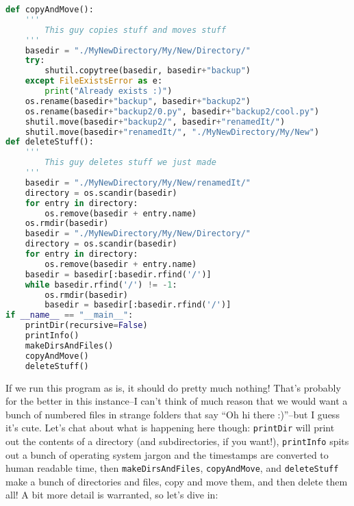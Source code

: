 \documentclass[12pt, twoside, reqno]{book}
\begin{document}
\begin{lstlisting}[language=Python]
def copyAndMove():
    '''
        This guy copies stuff and moves stuff
    '''
    basedir = "./MyNewDirectory/My/New/Directory/"
    try:
        shutil.copytree(basedir, basedir+"backup")
    except FileExistsError as e:
        print("Already exists :)")
    os.rename(basedir+"backup", basedir+"backup2")
    os.rename(basedir+"backup2/0.py", basedir+"backup2/cool.py")
    shutil.move(basedir+"backup2/", basedir+"renamedIt/")
    shutil.move(basedir+"renamedIt/", "./MyNewDirectory/My/New")
def deleteStuff():
    '''
        This guy deletes stuff we just made
    '''
    basedir = "./MyNewDirectory/My/New/renamedIt/"
    directory = os.scandir(basedir)
    for entry in directory:
        os.remove(basedir + entry.name)
    os.rmdir(basedir)
    basedir = "./MyNewDirectory/My/New/Directory/"
    directory = os.scandir(basedir)
    for entry in directory:
        os.remove(basedir + entry.name)
    basedir = basedir[:basedir.rfind('/')]
    while basedir.rfind('/') != -1:
        os.rmdir(basedir)
        basedir = basedir[:basedir.rfind('/')]
if __name__ == "__main__":
    printDir(recursive=False)
    printInfo()
    makeDirsAndFiles()
    copyAndMove()
    deleteStuff()
\end{lstlisting}

If we run this program as is, it should do pretty much nothing! That's probably for the better in this instance--I can't think of much reason that we would want a bunch of numbered files in strange folders that say ``Oh hi there :)''--but I guess it's cute. Let's chat about what is happening here though: \texttt{printDir} will print out the contents of a directory (and subdirectories, if you want!), \texttt{printInfo} spits out a bunch of operating system jargon and the timestamps are converted to human readable time, then \texttt{makeDirsAndFiles}, \texttt{copyAndMove}, and \texttt{deleteStuff} make a bunch of directories and files, copy and move them, and then delete them all! A bit more detail is warranted, so let's dive in:
\end{document}
